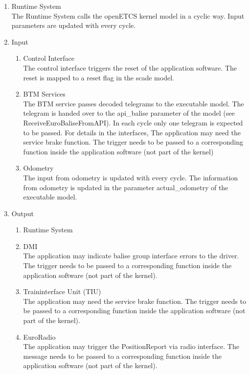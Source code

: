 \documentclass{template/openetcs_report}
\begin{document}
\begin{enumerate}
\item Runtime System\\
The Runtime System calls the openETCS kernel model in a cyclic way. Input parameters are updated with every cycle.
\item Input
\begin{enumerate}
\item Control Interface\\
The control interface triggers the reset of the application software. The reset is mapped to a reset flag in the scade model.

\item BTM Services\\
The BTM service passes decoded telegrams to the executable model. The telegram is handed over to the api_balise parameter of the model (see ReceiveEuroBaliseFromAPI). In each cycle only one telegram is expected to be passed. For details in the interfaces, The application may need the service brake function. The trigger needs to be passed to a corresponding function inside the application software (not part of the kernel)

\item Odometry\\
The input from odometry is updated with every cycle. The information from odometry is updated in the parameter actual_odometry of the executable model.
\end{enumerate}

\item Output
\begin{enumerate}
\item Runtime System\\
\item DMI\\
The application may indicate balise group interface errors to the driver. The trigger needs to be passed to a corresponding function inside the application software (not part of the kernel).
\item Traininterface Unit (TIU)\\
The application may need the service brake function. The trigger needs to be passed to a corresponding function inside the application software (not part of the kernel).
\item EuroRadio\\
The application may trigger the PositionReport via radio interface. The message needs to be passed to a corresponding function inside the application software (not part of the kernel).
\end{enumerate}

\end{enumerate}
\end{document}
